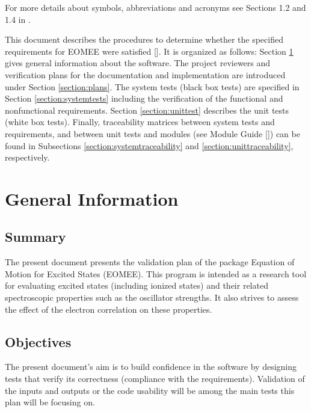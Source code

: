 \documentclass[12pt, titlepage]{article}
\begin{document}
For more details about symbols, abbreviations and acronyms see Sections 1.2 and 
1.4 in \cite{SRS2020}.

\newpage


This document describes the procedures to determine whether the specified 
requirements for EOMEE were satisfied [\cite{SRS2020}]. It is organized as 
follows: Section \ref{section:geninfo} gives general information about the 
software. The project reviewers and verification plans for the documentation 
and implementation are introduced under Section \ref{section:plans}. The system 
tests (black box tests) are specified in Section \ref{section:systemtests} 
including the verification of the functional and nonfunctional requirements. 
Section \ref{section:unittest} describes the unit tests (white box tests). 
Finally, traceability matrices between system tests and requirements, and 
between unit tests and modules (see Module Guide [\cite{MG2020}]) can be found 
in Subsections \ref{section:systemtraceability} and 
\ref{section:unittraceability}, respectively.

\section{General Information}
\label{section:geninfo}

\subsection{Summary}

The present document presents the validation plan of the package Equation of 
Motion for Excited States (EOMEE). This program is intended as a research tool 
for evaluating excited states (including ionized states) and their related 
spectroscopic properties such as the oscillator strengths. It also strives to 
assess the effect of the electron correlation on these properties.

\subsection{Objectives}

The present document's aim is to build confidence in the software by designing 
tests that verify its correctness (compliance with the requirements). 
Validation of the inputs and outputs or the 
code usability will be among the main tests this plan will be focusing on.
\end{document}
